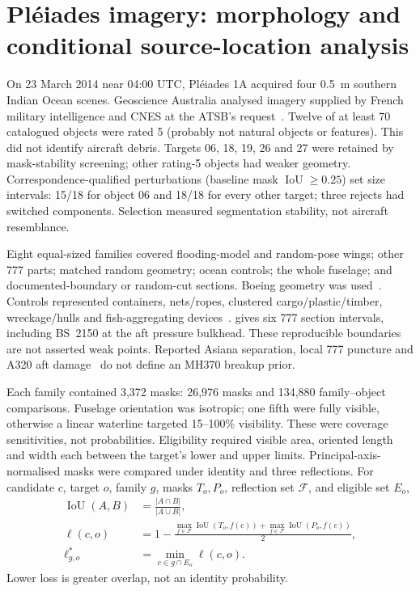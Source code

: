 \section{Pl\'eiades imagery: morphology and conditional source-location analysis}
\label{sec:pleiades-conditional}

On 23 March 2014 near 04:00 UTC, Pl\'eiades 1A acquired four 0.5~m
southern Indian Ocean scenes. Geoscience Australia analysed imagery supplied
by French military intelligence and CNES at the ATSB's
request~\citep{minchin2017pleiades}. Twelve of at least 70 catalogued objects
were rated 5 (probably not natural objects or features). This did not identify
aircraft debris. Targets 06, 18, 19, 26 and 27 were retained by mask-stability
screening; other rating-5 objects had weaker geometry. Correspondence-qualified
perturbations (baseline mask $\operatorname{IoU}\geq0.25$) set size intervals:
15/18 for object 06 and 18/18 for every other target; three rejects had switched
components. Selection measured segmentation stability, not aircraft
resemblance.

Eight equal-sized families covered flooding-model and random-pose wings; other
777 parts; matched random geometry; ocean controls; the whole fuselage; and
documented-boundary or random-cut sections. Boeing geometry was
used~\citep{boeing2024acap}. Controls represented containers, nets/ropes,
clustered cargo/plastic/timber, wreckage/hulls and fish-aggregating
devices~\citep{hapag2016container,iotc2023observer,lebreton2018plastic}.
\citet{murphy2013structures} gives six 777 section intervals, including BS~2150
at the aft pressure bulkhead. These reproducible boundaries are not asserted
weak points. Reported Asiana separation, local 777 puncture and A320 aft
damage~\citep{aaib2010ba38,ntsb2010hudson,ntsb2014asiana} do not define an
MH370 breakup prior.

Each family contained 3,372 masks: 26,976 masks and 134,880 family--object
comparisons. Fuselage orientation was isotropic; one fifth were fully visible,
otherwise a linear waterline targeted 15--100\% visibility. These were coverage
sensitivities, not probabilities. Eligibility required visible area, oriented
length and width each between the target's lower and upper limits.
Principal-axis-normalised masks were compared under identity and three
reflections. For candidate $c$, target $o$, family $g$, masks $T_o,P_o$,
reflection set $\mathcal F$, and eligible set $E_o$,
\begin{equation}
\begin{aligned}
  \operatorname{IoU}(A,B)
    &=\frac{|A\cap B|}{|A\cup B|},\\
  \ell(c,o)
    &=1-\frac{
      \max_{f\in\mathcal F}\operatorname{IoU}(T_o,f(c))+
      \max_{f\in\mathcal F}\operatorname{IoU}(P_o,f(c))
    }{2},\\
  \ell^{*}_{g,o}
    &=\min_{c\in g\cap E_o}\ell(c,o).
\end{aligned}
\label{eq:pleiades-mask-loss}
\end{equation}
Lower loss is greater overlap, not an identity probability.

